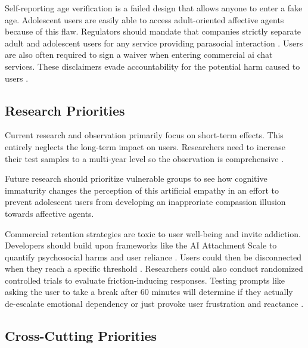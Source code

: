 Self-reporting age verification is a failed design that allows anyone to enter a fake age. Adolescent users are easily able to access adult-oriented affective agents because of this flaw. Regulators should mandate that companies strictly separate adult and adolescent users for any service providing parasocial interaction \cite[pp.~3--5]{kg_compassion_2024}. Users are also often required to sign a waiver when entering commercial \gls{ai} chat services. These disclaimers evade accountability for the potential harm caused to users \cite[pp.~10--12]{burtell_artificial_2023}\cite[pp.~19--21]{defreitas_emotional_2025}.

\subsection{Research Priorities}

Current research and observation primarily focus on short-term effects. This entirely neglects the long-term impact on users. Researchers need to increase their test samples to a multi-year level so the observation is comprehensive \cite[pp.~12--14]{fang_how_2025}.

Future research should prioritize vulnerable groups to see how cognitive immaturity changes the perception of this artificial empathy \cite[pp.~6--8]{kg_compassion_2024} in an effort to prevent adolescent users from developing an inapproriate compassion illusion towards affective agents.

Commercial retention strategies are toxic to user well-being and invite addiction. Developers should build upon frameworks like the AI Attachment Scale \cite{kasturiratna_attachment_2026} to quantify psychosocial harms and user reliance \cite[pp.~4--6]{cheng_measuring_2026}. Users could then be disconnected when they reach a specific threshold \cite[pp.~4--6]{cheng_measuring_2026}\cite[pp.~15--18]{defreitas_emotional_2025}. Researchers could also conduct randomized controlled trials to evaluate friction-inducing responses. Testing prompts like asking the user to take a break after 60 minutes will determine if they actually de-escalate emotional dependency or just provoke user frustration and reactance \cite[pp.~2--4]{fang_how_2025}.

\subsection{Cross-Cutting Priorities}


